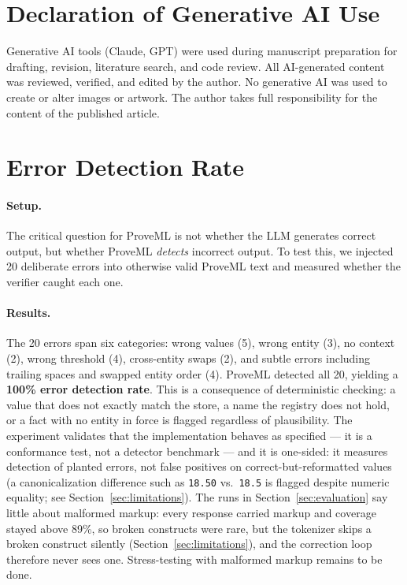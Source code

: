 \documentclass[11pt,a4paper]{article}
\begin{document}
\section*{Declaration of Generative AI Use}

Generative AI tools (Claude, GPT) were used during manuscript preparation for drafting, revision, literature search, and code review. All AI-generated content was reviewed, verified, and edited by the author. No generative AI was used to create or alter images or artwork. The author takes full responsibility for the content of the published article.




\appendix

\section{Error Detection Rate}
\label{sec:detection}

\paragraph{Setup.} The critical question for ProveML is not whether the LLM generates correct output, but whether ProveML \textit{detects} incorrect output. To test this, we injected 20 deliberate errors into otherwise valid ProveML text and measured whether the verifier caught each one.

\paragraph{Results.} The 20 errors span six categories: wrong values (5), wrong entity (3), no context (2), wrong threshold (4), cross-entity swaps (2), and subtle errors including trailing spaces and swapped entity order (4). ProveML detected all 20, yielding a \textbf{100\% error detection rate}. This is a consequence of deterministic checking: a value that does not exactly match the store, a name the registry does not hold, or a fact with no entity in force is flagged regardless of plausibility. The experiment validates that the implementation behaves as specified --- it is a conformance test, not a detector benchmark --- and it is one-sided: it measures detection of planted errors, not false positives on correct-but-reformatted values (a canonicalization difference such as \texttt{18.50} vs.\ \texttt{18.5} is flagged despite numeric equality; see Section~\ref{sec:limitations}). The runs in Section~\ref{sec:evaluation} say little about malformed markup: every response carried markup and coverage stayed above 89\%, so broken constructs were rare, but the tokenizer skips a broken construct silently (Section~\ref{sec:limitations}), and the correction loop therefore never sees one. Stress-testing with malformed markup remains to be done.
\end{document}
